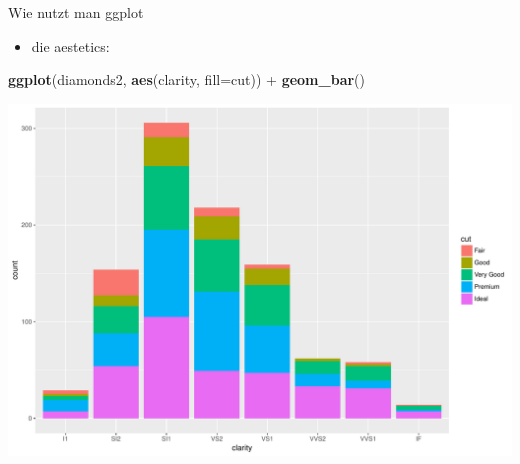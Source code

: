 \documentclass[ignorenonframetext,]{beamer}
\newenvironment{Shaded}{}{}
\newcommand{\KeywordTok}[1]{\textcolor[rgb]{0.00,0.44,0.13}{\textbf{{#1}}}}
\newcommand{\DataTypeTok}[1]{\textcolor[rgb]{0.56,0.13,0.00}{{#1}}}
\newcommand{\StringTok}[1]{\textcolor[rgb]{0.25,0.44,0.63}{{#1}}}
\newcommand{\NormalTok}[1]{{#1}}
\providecommand{\tightlist}{%
\setlength{\itemsep}{0pt}\setlength{\parskip}{0pt}}
\begin{document}
\begin{frame}[fragile]{Wie nutzt man ggplot}

\begin{itemize}
\tightlist
\item
  die aestetics:
\end{itemize}

\begin{Shaded}
\begin{Highlighting}[]
\KeywordTok{ggplot}\NormalTok{(diamonds2, }\KeywordTok{aes}\NormalTok{(clarity, }\DataTypeTok{fill=}\NormalTok{cut)) +}\StringTok{ }\KeywordTok{geom_bar}\NormalTok{()}
\end{Highlighting}
\end{Shaded}

\includegraphics{RSocialScience2_files/figure-beamer/unnamed-chunk-18-1.pdf}

\end{frame}
\end{document}
